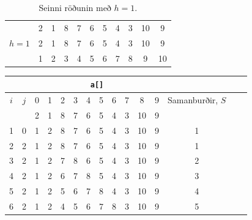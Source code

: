 \documentclass[12pt, a4paper, hidelinks]{article}
\begin{document}
\begin{table}[H]
   \centering
   \begin{tabular}{l|cccccccccc}
        \toprule
        \multirow{3}{*}{$h = 1$} & 2 & 1 & 8 & 7 & 6 & 5 & 4 & 3 & 10 & 9 \\
            & 2 & 1 & 8 & 7 & 6 & 5 & 4 & 3 & 10 & 9 \\
            \cmidrule{2-11}
            & 1 & 2 & 3 & 4 & 5 & 6 & 7 & 8 & 9 & 10 \\
        \bottomrule
   \end{tabular}
   \caption{Seinni röðunin með $h = 1$.}\label{tafla:1rodun}
\end{table}

\newpage

\begin{table}[ht!]
    \centering
    \begin{tabular}[pos]{cc|ccccccccccccc}
    \multicolumn{2}{c}{} & \multicolumn{10}{c}{\texttt{a[]}} \\
    \toprule
    $i$ & $j$ & 0 & 1 & 2 & 3 & 4 & 5 & 6 & 7 & 8  & 9 & Samanburðir, $S$ \\
    \midrule
        &     & 2 & 1 & 8 & 7 & 6 & 5 & 4 & 3 & 10 & 9 \\
    1   & 0   & \color{red}  1 & 2 & \color{lightgray} 8 & \color{lightgray} 7 & \color{lightgray} 6 & \color{lightgray} 5 & \color{lightgray} 4 & \color{lightgray} 3 & \color{lightgray} 10 & \color{lightgray} 9 & 1\\
    2   & 2   & \color{lightgray} 1 & \color{lightgray}  2 & \color{red} 8 & \color{lightgray} 7 & \color{lightgray} 6 & \color{lightgray} 5 & \color{lightgray} 4 & \color{lightgray} 3 & \color{lightgray} 10 & \color{lightgray} 9 & 1 \\
    3   & 2   & \color{lightgray} 1 & \color{lightgray}  2 & \color{red} 7 & 8 & \color{lightgray} 6 & \color{lightgray} 5 & \color{lightgray} 4 & \color{lightgray} 3 & \color{lightgray} 10 & \color{lightgray} 9 & 2\\
    4   & 2   & \color{lightgray} 1 & \color{lightgray}  2 & \color{red} 6 & 7 & 8 & \color{lightgray} 5 & \color{lightgray} 4 & \color{lightgray} 3 & \color{lightgray} 10 & \color{lightgray} 9 & 3 \\ 
    5   & 2   & \color{lightgray} 1 & \color{lightgray}  2 & \color{red} 5 & 6 & 7 & 8 & \color{lightgray} 4 & \color{lightgray} 3 & \color{lightgray} 10 & \color{lightgray} 9 & 4 \\
    6   & 2   & \color{lightgray} 1 & \color{lightgray}  2 & \color{red} 4 & 5 & 6 & 7 & 8 & \color{lightgray} 3 & \color{lightgray} 10 & \color{lightgray} 9 & 5 \\ 

\end{tabular}
\end{table}
\end{document}
